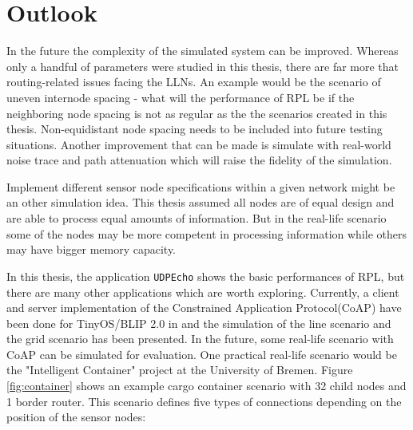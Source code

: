
\section{Outlook}
\label{outlook}




In the future the complexity of the simulated system can be improved. Whereas only a handful of parameters were studied in this thesis, there are far more that routing-related issues facing the LLNs. An example would be the scenario of uneven internode spacing - what will the performance of RPL be if the neighboring node spacing is not as regular as the the scenarios created in this thesis. Non-equidistant node spacing needs to be included into future testing situations. Another improvement that can be made is simulate with real-world noise trace and path attenuation which will raise the fidelity of the simulation.

Implement different sensor node specifications within a given network might be an other simulation idea.  This thesis assumed all nodes are of equal design and are able to process equal amounts of information. But in the real-life scenario some of the nodes may be more competent in processing information while others may have bigger memory capacity.

In this thesis, the application \texttt{UDPEcho} shows the basic performances of RPL, but there are many other applications which are worth exploring. Currently, a client and server implementation of the Constrained Application Protocol(CoAP) have been done for TinyOS/BLIP 2.0 in \cite{TP11} and the simulation of the line scenario and the grid scenario has been presented. In the future, some real-life scenario with CoAP can be simulated for evaluation. One practical real-life scenario would be the "Intelligent Container" project at the University of Bremen. Figure \ref{fig:container} shows an example cargo container scenario with 32 child nodes and 1 border router. This scenario defines five types of connections depending on the position of the sensor nodes:

